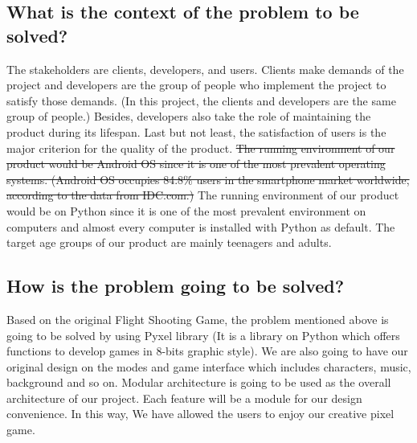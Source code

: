 \documentclass[11pt,fleqn]{article}
\begin{document}
\subsection*{What is the context of the problem to be solved?}
The stakeholders are clients, developers, and users. Clients make demands of the project and developers are the group of people who implement the project to satisfy those demands. (In this project, the clients and developers are the same group of people.) Besides, developers also take the role of maintaining the product during its lifespan. Last but not least, the satisfaction of users is the major criterion for the quality of the product. \sout{The running environment of our product would be Android OS since it is one of the most prevalent operating systems. (Android OS occupies 84.8\% users in the smartphone market worldwide, according to the data from IDC.com.)} {\color{red}The running environment of our product would be on Python since it is one of the most prevalent environment on computers and almost every computer is installed with Python as default.} The target age groups of our product are mainly teenagers and adults. 
\color{red}\subsection*{How is the problem going to be solved?}
{\color{red}Based on the original Flight Shooting Game, the problem mentioned above is going to be solved by using Pyxel library (It is a library on Python which offers functions to develop games in 8-bits graphic style). We are also going to have our original design on the modes and game interface which includes characters, music, background and so on. Modular architecture is going to be used as the overall architecture of our project. Each feature will be a module for our design convenience. In this way, We have allowed the users to enjoy our creative pixel game.}
\end{document}

